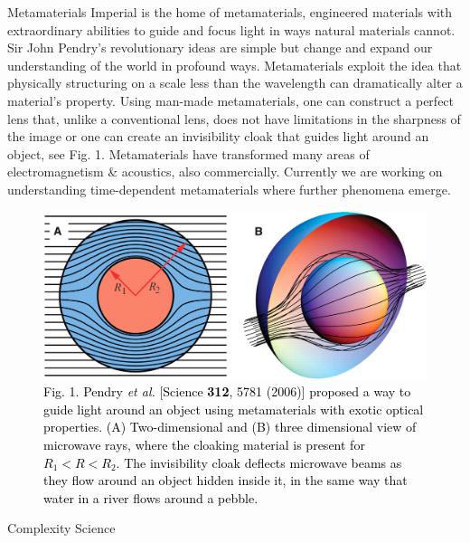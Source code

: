 \documentclass[xcolor={table}]{beamer}
\begin{document}
\begin{frame}[fragile=singleslide,t]
\begin{columns}[onlytextwidth,T]
\begin{column}{.47\textwidth}
\begin{block}{Metamaterials}
Imperial is the home of metamaterials, engineered materials with extraordinary abilities to guide and focus light in ways natural materials cannot. Sir John Pendry's revolutionary ideas are simple but change and expand our understanding of the world in profound ways.
Metamaterials exploit the idea that physically structuring on a scale less than the wavelength can dramatically alter a material’s property. Using man-made metamaterials, one can construct a perfect lens that, unlike a conventional lens, does not have limitations in the sharpness of the image or one can  create an invisibility cloak that guides light around an object, see Fig. 1. Metamaterials have transformed many areas of electromagnetism \& acoustics,  also commercially. Currently we are working on understanding time-dependent metamaterials where further phenomena emerge.
\end{block}
\vspace*{-1.5cm}
\begin{figure}
\centering
    \includegraphics[width=0.9\columnwidth]{Cloak.jpeg}
    \caption{\footnotesize \textcolor{black}{Fig. 1. Pendry {\it \footnotesize et al.} [Science {\bf \footnotesize 312}, 5781 (2006)] proposed a way to guide light around an object using metamaterials with exotic optical properties. (A) Two-dimensional and (B) three dimensional view of microwave rays, where the cloaking material is present for $R_1 < R < R_2$. The invisibility cloak deflects microwave beams as they flow around an object hidden inside it, in the same way that water in a river flows around a pebble.}}
\end{figure}

\begin{block}{Complexity Science}


\end{block}
\end{column}
\end{columns}
\end{frame}
\end{document}
